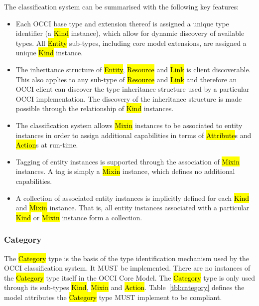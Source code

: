 \documentclass[10pt,a4paper]{article}
\begin{document}
The classification system can be summarised with the following key
features:

\begin{itemize}
  \item Each OCCI base type and extension thereof is assigned a unique
    type identifier (a \hl{Kind} instance), which allow for dynamic
    discovery of available types. All \hl{Entity} sub-types, including
    core model extensions, are assigned a unique \hl{Kind} instance.

  \item The inheritance structure of \hl{Entity}, \hl{Resource} and
    \hl{Link} is client discoverable. This also applies to any
    sub-type of \hl{Resource} and \hl{Link} and therefore an OCCI
    client can discover the type inheritance structure used by a
    particular OCCI implementation. The discovery of the inheritance
    structure is made possible through the relationship of \hl{Kind}
    instances.

  \item The classification system allows \hl{Mixin} instances to be
    associated to entity instances in order to assign additional
    capabilities in terms of \hl{Attribute}s and \hl{Action}s at
    run-time.

  \item Tagging of entity instances is supported through the
    association of \hl{Mixin} instances. A tag is simply a \hl{Mixin}
    instance, which defines no additional capabilities.

  \item A collection of associated entity instances is implicitly
    defined for each \hl{Kind} and \hl{Mixin} instance. That is, all
    entity instances associated with a particular \hl{Kind} or
    \hl{Mixin} instance form a collection.
\end{itemize}

\subsubsection{Category}
\label{sec:category}
The \hl{Category} type is the basis of the type identification
mechanism used by the OCCI classification system. It MUST be
implemented.
There are no instances of the \hl{Category} type itself in the OCCI Core Model.
The \hl{Category} type is only used through its sub-types \hl{Kind}, \hl{Mixin}
and \hl{Action}.
%
Table~\ref{tbl:category} defines the model attributes the \hl{Category} type
MUST implement to be compliant.
\end{document}
